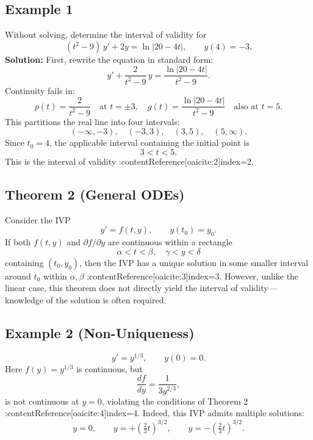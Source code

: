 \documentclass[12pt]{book}
\begin{document}
\subsection*{Example 1}
Without solving, determine the interval of validity for
\[
(t^2 - 9)\,y' + 2y = \ln\!\bigl|20 - 4t\bigr|,\qquad y(4) = -3.
\]
\textbf{Solution:}
First, rewrite the equation in standard form:
\[
y' + \frac{2}{t^2 - 9}\,y = \frac{\ln|20 - 4t|}{t^2 - 9}.
\]
Continuity fails in:
\[
p(t) = \frac{2}{t^2 - 9} \quad\text{at } t = \pm 3, \quad
g(t) = \frac{\ln|20 - 4t|}{t^2 - 9} \quad\text{also at } t = 5.
\]
This partitions the real line into four intervals:
\[
(-\infty, -3),\quad (-3, 3),\quad (3, 5),\quad (5, \infty).
\]
Since \(t_0 = 4\), the applicable interval containing the initial point is
\[
\boxed{3 < t < 5}.
\]
This is the interval of validity :contentReference[oaicite:2]{index=2}.

\subsection*{Theorem 2 (General ODEs)}
Consider the IVP
\[
y' = f(t, y), \qquad y(t_0) = y_0.
\]
If both \(f(t, y)\) and \(\partial f/\partial y\) are continuous within a rectangle
\[
\alpha < t < \beta,\quad \gamma < y < \delta
\]
containing \((t_0, y_0)\), then the IVP has a unique solution in some smaller interval around \(t_0\) within \(\alpha, \beta\) :contentReference[oaicite:3]{index=3}. However, unlike the linear case, this theorem does not directly yield the interval of validity—knowledge of the solution is often required.

\subsection*{Example 2 (Non-Uniqueness)}
\[
y' = y^{1/3}, \qquad y(0) = 0.
\]
Here \(f(y) = y^{1/3}\) is continuous, but
\[
\frac{df}{dy} = \frac{1}{3 y^{2/3}},
\]
is not continuous at \(y = 0\), violating the conditions of Theorem 2 :contentReference[oaicite:4]{index=4}. Indeed, this IVP admits multiple solutions:
\[
y = 0,\qquad y = +\left(\tfrac{2}{3}t\right)^{3/2},\qquad y = -\left(\tfrac{2}{3}t\right)^{3/2}.
\]
\end{document}
